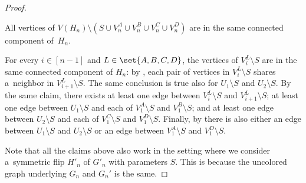 \begin{proof}
    \begin{claim}
        \label{cl:one-large-component}
        All vertices of $V(H_n) \setminus \left(S \cup V_n^A \cup V_n^B \cup V_n^C \cup V_n^D\right)$ are in the same connected component of~$H_n$.
    \end{claim}
    \begin{claimproof}
        For every $i \in [n - 1]$ and $L \in \set{A, B, C, D}$, the vertices of $V_i^L \setminus S$ are in the same connected component of $H_n$: by , each pair of vertices in $V_i^L \setminus S$ shares a~neighbor in $V_{i+1}^L \setminus S$.
        The same conclusion is true also for $U_1 \setminus S$ and $U_2 \setminus S$.
        By the same claim, there exists at least one edge between $V_i^L \setminus S$ and $V_{i+1}^L \setminus S$; at least one edge between $U_1 \setminus S$ and each of $V_1^A \setminus S$ and $V_1^B \setminus S$; and at least one edge between $U_2 \setminus S$ and each of $V_1^C \setminus S$ and $V_1^D \setminus S$.
        Finally, by  there is also either an edge between $U_1 \setminus S$ and $U_2 \setminus S$ or an edge between $V_1^A \setminus S$ and $V_1^D \setminus S$.
    \end{claimproof}

    Note that all the claims above also work in the setting where we consider a~symmetric flip $H'_n$ of $G'_n$ with parameters $S$. This is because the uncolored graph underlying $G_n$ and $G_n'$ is the same.


\end{proof}
